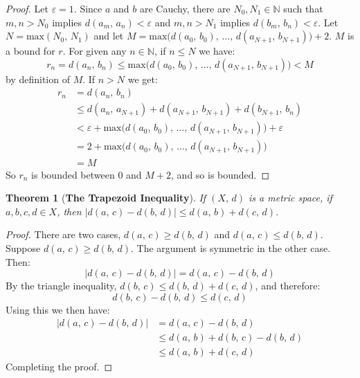 \documentclass{article}
\theoremstyle{plain}
\newtheorem{theorem}{Theorem}
\theoremstyle{normal}
\begin{document}
    \begin{proof}
        Let $\varepsilon=1$. Since $a$ and $b$ are Cauchy, there are
        $N_{0},N_{1}\in\mathbb{N}$ such that $m,n>N_{0}$ implies
        $d(a_{m},\,a_{n})<\varepsilon$ and $m,n>N_{1}$ implies
        $d(b_{m},\,b_{n})<\varepsilon$. Let $N=\textrm{max}(N_{0},\,N_{1})$
        and let
        $M=\textrm{max}\big(d(a_{0},\,b_{0}),\,\dots,\,d(a_{N+1},\,b_{N+1})\big)+2$.
        $M$ is a bound for $r$. For given any $n\in\mathbb{N}$, if $n\leq{N}$
        we have:
        \begin{equation}
            r_{n}=d(a_{n},\,b_{n})\leq\textrm{max}
                \big(d(a_{0},\,b_{0}),\,\dots,\,d(a_{N+1},\,b_{N+1})\big)
                <M
        \end{equation}
        by definition of $M$. If $n>N$ we get:
        \begin{align}
            r_{n}
            &=d(a_{n},\,b_{n})\\
            &\leq{d}(a_{n},\,a_{N+1})+d(a_{N+1},\,b_{N+1})
                +d(b_{N+1},\,b_{n})\\
            &<\varepsilon+
                \textrm{max}\big(d(a_{0},\,b_{0}),\,\dots,\,d(a_{N+1},\,b_{N+1})\big)+
                \varepsilon\\
            &=2+\textrm{max}\big(d(a_{0},\,b_{0}),\,\dots,\,d(a_{N+1},\,b_{N+1})\big)\\
            &=M
        \end{align}
        So $r_{n}$ is bounded between $0$ and $M+2$, and so is bounded.
    \end{proof}
    \begin{theorem}[\textbf{The Trapezoid Inequality}]
        If $(X,\,d)$ is a metric space, if
        $a,b,c,d\in{X}$, then $|d(a,\,c)-d(b,\,d)|\leq{d}(a,\,b)+d(c,\,d)$.
    \end{theorem}
    \begin{proof}
        There are two cases, $d(a,\,c)\geq{d}(b,\,d)$ and
        $d(a,\,c)\leq{d}(b,\,d)$. Suppose $d(a,\,c)\geq{d}(b,\,d)$. The
        argument is symmetric in the other case. Then:
        \begin{equation}
            |d(a,\,c)-d(b,\,d)|=d(a,\,c)-d(b,\,d)
        \end{equation}
        By the triangle inequality,
        $d(b,\,c)\leq{d}(b,\,d)+d(c,\,d)$, and therefore:
        \begin{equation}
            d(b,\,c)-d(b,\,d)\leq{d}(c,\,d)
        \end{equation}
        Using this we then have:
        \begin{align}
            |d(a,\,c)-d(b,\,d)|
            &=d(a,\,c)-d(b,\,d)\\
            &\leq{d}(a,\,b)+d(b,\,c)-d(b,\,d)\\
            &\leq{d}(a,\,b)+d(c,\,d)
        \end{align}
        Completing the proof.
    \end{proof}
\end{document}
